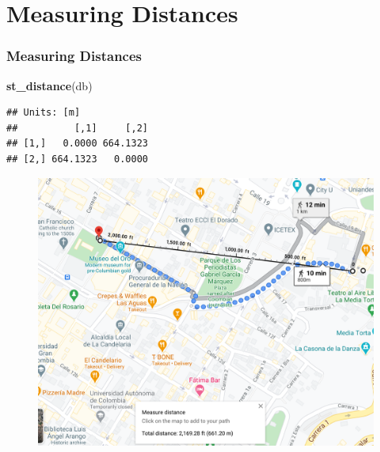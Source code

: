 \documentclass[
  shownotes,
  xcolor={svgnames},
  hyperref={colorlinks,citecolor=DarkBlue,linkcolor=DarkRed,urlcolor=DarkBlue}
  ]{beamer}
\newenvironment{Shaded}{\begin{snugshade}}{\end{snugshade}}
\newcommand{\KeywordTok}[1]{\textcolor[rgb]{0.13,0.29,0.53}{\textbf{#1}}}
\newcommand{\NormalTok}[1]{#1}
\begin{document}
\section{Measuring Distances}
\begin{frame}[fragile]
\frametitle{Measuring Distances}

\begin{Shaded}
\begin{Highlighting}[]
\KeywordTok{st\_distance}\NormalTok{(db)}
\end{Highlighting}
\end{Shaded}
\begin{scriptsize}
\begin{verbatim}
## Units: [m]
##          [,1]     [,2]
## [1,]   0.0000 664.1323
## [2,] 664.1323   0.0000
\end{verbatim}
\end{scriptsize}

\begin{figure}[H] \centering
  \centering
\includegraphics[scale=0.25]{figures/distance_google_maps}
  \\
  \end{figure}



\end{frame}
\end{document}
